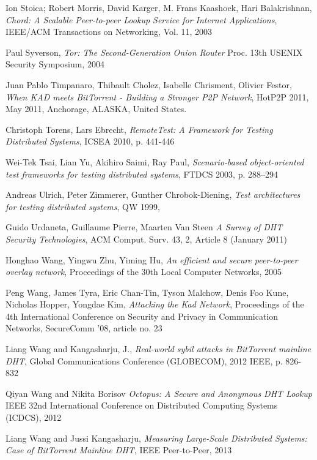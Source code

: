 \begin{thebibliography}{99}
  Ion Stoica; Robert Morris, David Karger, M. Frans Kaashoek, Hari Balakrishnan,
  \textit{Chord: A Scalable Peer-to-peer Lookup Service for Internet
  Applications},
  IEEE/ACM Transactions on Networking, Vol. 11, 2003

  Paul Syverson,
  \textit{Tor: The Second-Generation Onion Router}
  Proc. 13th USENIX Security Symposium,
  2004

  Juan Pablo Timpanaro, Thibault Cholez, Isabelle Chrisment, Olivier Festor,
  \textit{When KAD meets BitTorrent - Building a Stronger P2P Network},
  HotP2P 2011, May 2011, Anchorage, ALASKA, United States.

  Christoph Torens, Lars Ebrecht,
  \textit{RemoteTest: A Framework for Testing Distributed Systems},
  ICSEA 2010, p. 441-446

  Wei-Tek Tsai, Lian Yu, Akihiro Saimi, Ray Paul,
  \textit{Scenario-based object-oriented test frameworks for testing distributed
  systems},
  FTDCS 2003, p. {288--294}

  Andreas Ulrich, Peter Zimmerer, Gunther Chrobok-Diening,
  \textit{Test architectures for testing distributed systems},
  QW 1999,

 Guido Urdaneta, Guillaume Pierre, Maarten Van Steen
\textit{A Survey of DHT Security Technologies}, ACM Comput. Surv.  43, 2,
Article 8 (January 2011)

  Honghao Wang, Yingwu Zhu, Yiming Hu,
  \textit{An efficient and secure peer-to-peer overlay network}, 
  Proceedings of the 30th Local Computer Networks,
  2005

  Peng Wang, James Tyra, Eric Chan-Tin, Tyson Malchow, Denis Foo Kune, Nicholas
  Hopper, Yongdae Kim,
  \textit{Attacking the Kad Network},
  Proceedings of the 4th International Conference on Security and Privacy in
  Communication Networks, SecureComm '08, article no. 23

  Liang Wang and Kangasharju, J.,
  \textit{Real-world sybil attacks in BitTorrent mainline DHT},
  Global Communications Conference (GLOBECOM), 2012 IEEE, p. 826-832

   Qiyan Wang and Nikita Borisov
   \textit{Octopus: A Secure and Anonymous DHT Lookup}
   IEEE 32nd International Conference on Distributed Computing Systems (ICDCS), 2012

  Liang Wang and Jussi Kangasharju,
  \textit{Measuring Large-Scale Distributed Systems: Case of BitTorrent
  Mainline DHT}, 
  IEEE Peer-to-Peer, 2013


\end{thebibliography}


